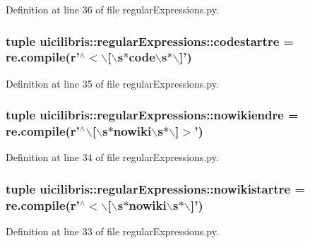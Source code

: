 \-Definition at line 36 of file regular\-Expressions.\-py.

\hypertarget{namespaceuicilibris_1_1regularExpressions_a18ed998acb9e817dddaa66dc71bb87b7}{
\subsubsection[{codestartre}]{\setlength{\rightskip}{0pt plus 5cm}tuple {\bf uicilibris\-::regular\-Expressions\-::codestartre} = re.\-compile(r'$^\wedge$$<$$\backslash$\mbox{[}$\backslash$s$\ast$code$\backslash$s$\ast$$\backslash$\mbox{]}')}}\label{namespaceuicilibris_1_1regularExpressions_a18ed998acb9e817dddaa66dc71bb87b7}


\-Definition at line 35 of file regular\-Expressions.\-py.

\hypertarget{namespaceuicilibris_1_1regularExpressions_a7f24f7d69e7df8d8f11a48b51da3d05e}{
\subsubsection[{nowikiendre}]{\setlength{\rightskip}{0pt plus 5cm}tuple {\bf uicilibris\-::regular\-Expressions\-::nowikiendre} = re.\-compile(r'$^\wedge$$\backslash$\mbox{[}$\backslash$s$\ast$nowiki$\backslash$s$\ast$$\backslash$\mbox{]}$>$')}}\label{namespaceuicilibris_1_1regularExpressions_a7f24f7d69e7df8d8f11a48b51da3d05e}


\-Definition at line 34 of file regular\-Expressions.\-py.

\hypertarget{namespaceuicilibris_1_1regularExpressions_afd5c26ee695e0e7bfc8dfc14ba7bb5fb}{
\subsubsection[{nowikistartre}]{\setlength{\rightskip}{0pt plus 5cm}tuple {\bf uicilibris\-::regular\-Expressions\-::nowikistartre} = re.\-compile(r'$^\wedge$$<$$\backslash$\mbox{[}$\backslash$s$\ast$nowiki$\backslash$s$\ast$$\backslash$\mbox{]}')}}\label{namespaceuicilibris_1_1regularExpressions_afd5c26ee695e0e7bfc8dfc14ba7bb5fb}


\-Definition at line 33 of file regular\-Expressions.\-py.

